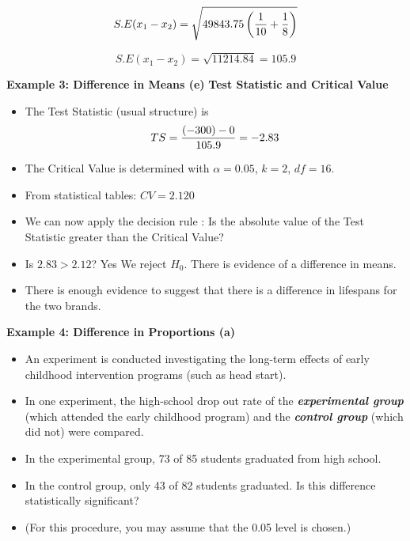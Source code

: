 \documentclass[a4]{beamer}
\begin{document}
\[ S.E(x_1 - x_2) = \sqrt{49843.75 \left({1\over 10}+{1\over 8} \right)}\]

\[ S.E(x_1 - x_2) = \sqrt{11214.84} = 105.9\]




\noindent \textbf{Example 3: Difference in Means (e) }
\textbf{Test Statistic and Critical Value}\\
\begin{itemize}
\item The Test Statistic (usual structure) is \[ TS  = {(-300) - 0 \over 105.9}  = -2.83 \]
\item The Critical Value is determined  with $\alpha = 0.05$, $k=2$, $df = 16 $. 
\item From statistical tables: $CV = 2.120$
\item We can now apply the decision rule : Is the absolute value of the Test Statistic greater than the Critical Value?
\item Is $2.83 > 2.12$? Yes We reject $H_0$. There is evidence of a difference in means. 
\item There is enough evidence to suggest that there is a difference in lifespans for the two brands.
\end{itemize}






\noindent \textbf{Example 4: Difference in Proportions (a)}
\begin{itemize}
\item An experiment is conducted investigating the long-term effects of early childhood intervention programs (such as head start).
\item In one experiment, the high-school drop out rate of the \textit{\textbf{experimental group}} (which attended the early childhood program)
 and the \textit{\textbf{control group}} (which did not) were compared.
\item In the experimental group, 73 of 85 students graduated from high school. \item In the control group, only 43 of 82 students graduated.
Is this difference statistically significant? \item(For this procedure, you may assume that the 0.05 level is chosen.) \end{itemize}
\end{document}

